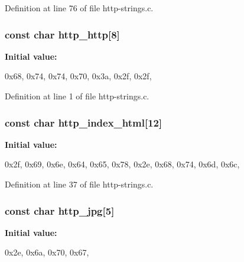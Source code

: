 Definition at line 76 of file http-\/strings.c.

\hypertarget{http-strings_8c_acaaccd24059edb3f7a8182b1d6b83c78}{
\subsubsection[{http\_\-http}]{\setlength{\rightskip}{0pt plus 5cm}const char {\bf http\_\-http}\mbox{[}8\mbox{]}}}
\label{http-strings_8c_acaaccd24059edb3f7a8182b1d6b83c78}
{\bfseries Initial value:}
\begin{DoxyCode}
 

{0x68, 0x74, 0x74, 0x70, 0x3a, 0x2f, 0x2f, }
\end{DoxyCode}


Definition at line 1 of file http-\/strings.c.

\hypertarget{http-strings_8c_ae3489af8c42b05e3c9f786e3f7be2d2f}{
\subsubsection[{http\_\-index\_\-html}]{\setlength{\rightskip}{0pt plus 5cm}const char {\bf http\_\-index\_\-html}\mbox{[}12\mbox{]}}}
\label{http-strings_8c_ae3489af8c42b05e3c9f786e3f7be2d2f}
{\bfseries Initial value:}
\begin{DoxyCode}
 

{0x2f, 0x69, 0x6e, 0x64, 0x65, 0x78, 0x2e, 0x68, 0x74, 0x6d, 0x6c, }
\end{DoxyCode}


Definition at line 37 of file http-\/strings.c.

\hypertarget{http-strings_8c_acecfa49a95be67df62b2421efe1d5be3}{
\subsubsection[{http\_\-jpg}]{\setlength{\rightskip}{0pt plus 5cm}const char {\bf http\_\-jpg}\mbox{[}5\mbox{]}}}
\label{http-strings_8c_acecfa49a95be67df62b2421efe1d5be3}
{\bfseries Initial value:}
\begin{DoxyCode}
 

{0x2e, 0x6a, 0x70, 0x67, }
\end{DoxyCode}


